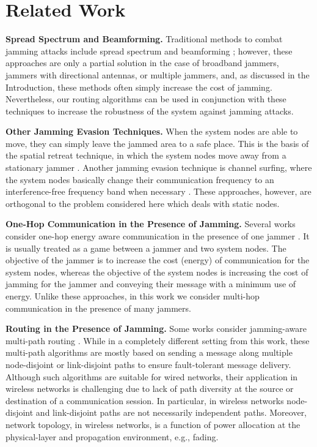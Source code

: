 \documentclass[10pt,journal]{IEEEtran}
\theoremstyle{definition}
\begin{document}
\section{Related Work}
\textbf{Spread Spectrum and Beamforming.}
Traditional methods to combat jamming attacks include spread spectrum and beamforming \cite{proakis2000digital,peterson1995introduction,scholtz1982origins,liu2010randomized,zhou2002digital}; however, these approaches are only a partial solution in the case of broadband jammers, jammers with directional antennas, or multiple jammers, and, as discussed in the Introduction,  these methods often simply  increase the cost of jamming.  
Nevertheless, our routing algorithms can be used in conjunction with these techniques to increase the robustness of the system against  jamming attacks.

\textbf{Other Jamming Evasion Techniques.} 
When the system nodes are able to move, they can simply leave the jammed area to a safe place. This is the basis of the spatial retreat technique, in which the system nodes move away from a stationary jammer \cite{xu2004channel,xu2006jamming}.
Another jamming evasion technique is channel surfing, where  the system nodes basically change their communication frequency to an interference-free frequency band when necessary \cite{xu2007channel}. 
These approaches, however, are orthogonal to the problem considered here which deals with static nodes.



\textbf{One-Hop Communication in the Presence of  Jamming.}
Several works consider one-hop energy aware communication  in the presence of one jammer \cite{mal2000analysis,li2007optimal,zhu2010stochastic,khan2011adaptive}. It is usually treated as a game between a jammer and two system nodes. The objective of the jammer is to increase the cost (energy) of  communication for the system nodes, whereas the objective of the system nodes is  increasing the cost of jamming for the jammer and  conveying their message with a minimum use of energy.
Unlike these approaches, in this work  we consider multi-hop communication in the presence of many jammers.

{\textbf{Routing  in the Presence of Jamming.}
Some works  consider jamming-aware  multi-path routing \cite{kushman2007r,mueller2004multipath,nasipuri1999demand,yang2006source,mustafa2012jamming}.   While in a completely different setting from this work, these multi-path algorithms are mostly based on
sending a message along multiple node-disjoint or link-disjoint
paths to ensure fault-tolerant message delivery. Although such algorithms are suitable for wired
networks, their application in wireless networks is challenging
due to lack of path diversity at the source or destination of
a communication session. In particular, in
wireless networks node-disjoint and link-disjoint paths are not
necessarily independent paths. Moreover, network topology, in wireless networks, is a function of power allocation at the physical-layer and propagation environment,
e.g., fading.}
\end{document}
